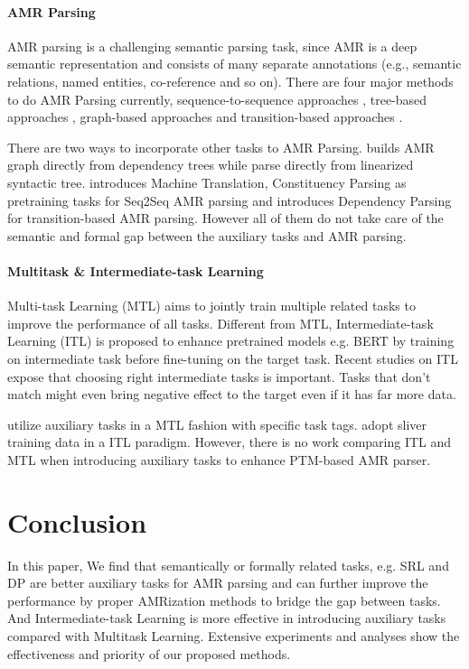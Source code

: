 \documentclass[11pt]{article}
\begin{document}
\paragraph{AMR Parsing}
AMR parsing is a challenging semantic parsing task, since AMR is a deep semantic representation and consists of many separate annotations \cite{ban-AMR} (e.g., semantic relations, named entities, co-reference and so on).
There are four major methods to do AMR Parsing currently, sequence-to-sequence approaches \cite{ge-seq2seqamr, xu-seqpretrain, bevil-spring, HCL},
tree-based approaches \cite{zhang2019broad, zhang2019amr}, graph-based approaches \cite{lyu2018amr, cai2020amr} and transition-based approaches \cite{naseem2019rewarding, lee2020pushing, zhou2021amr}. 

There are two ways to incorporate other tasks to AMR Parsing. \citet{Goodman2016NoiseRA} builds AMR graph directly from dependency trees while \cite{ge-seq2seqamr} parse directly from linearized syntactic tree.  \citet{xu-seqpretrain} introduces Machine Translation, Constituency Parsing as pretraining tasks for Seq2Seq AMR parsing and \citet{Wu2021ImprovingAP} introduces Dependency Parsing for transition-based AMR parsing.  However all of them do not take care of the semantic and formal gap between the auxiliary tasks and AMR parsing.



\paragraph{Multitask \& Intermediate-task Learning}
Multi-task Learning (MTL) \cite{caruana1997multitask} aims to jointly train multiple related tasks to improve the performance of all tasks. Different from MTL, Intermediate-task Learning (ITL) is proposed to enhance pretrained models e.g. BERT by training on intermediate task before fine-tuning on the target task. Recent studies\citep{kun2020intermediate,poth2021intermediate} on ITL expose that choosing right intermediate tasks is important. Tasks that don't match might even bring negative effect to the target even if it has far more data. 

\citet{xu-seqpretrain,Damonte2021OneSP,procopio-etal-2021-sgl} utilize auxiliary tasks in a MTL fashion with specific task tags. \citet{bevil-spring,saft} adopt sliver training data in a ITL paradigm.  However, there is no work comparing ITL and MTL when introducing auxiliary tasks to enhance PTM-based AMR parser.

 
\section{Conclusion}
In this paper, We find that semantically or formally related tasks, e.g. SRL and DP are better auxiliary tasks for AMR parsing and can further improve the performance by proper AMRization methods to bridge the gap between tasks. And Intermediate-task Learning is more effective in introducing auxiliary tasks compared with Multitask Learning. Extensive experiments and analyses show the effectiveness and priority of our proposed methods. 
\end{document}

